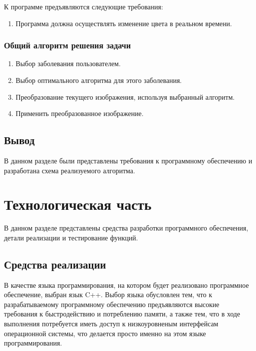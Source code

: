 \documentclass[a4paper,14pt, unknownkeysallowed]{extreport}
\begin{document}
    К программе предъявляются следующие требования:
    \begin{enumerate}
        \item Программа должна осуществлять изменение цвета в реальном времени.
    \end{enumerate}

    \subsection{Общий алгоритм решения задачи}

    \begin{enumerate}
        \item Выбор заболевания пользователем.
        \item Выбор оптимального алгоритма для этого заболевания.
        \item Преобразование текущего изображения, используя выбранный алгоритм.
        \item Применить преобразованное изображение.
    \end{enumerate}

    \section*{Вывод}
    В данном разделе были представлены требования к программному обеспечению и разработана схема реализуемого алгоритма.

    \chapter{Технологическая часть}

    В данном разделе представлены средства разработки программного обеспечения, детали реализации и тестирование функций.

    \section{Средства реализации}

    В качестве языка программирования, на котором будет реализовано программное обеспечение, выбран язык C++. Выбор языка обусловлен тем, что к разрабатываемому программному обеспечению предъявляются высокие требования к быстродействию и потреблению памяти, а также тем, что в ходе выполнения потребуется иметь доступ к низкоуровненым интерфейсам операционной системы, что делается просто именно на этом языке программирования.
\end{document}
